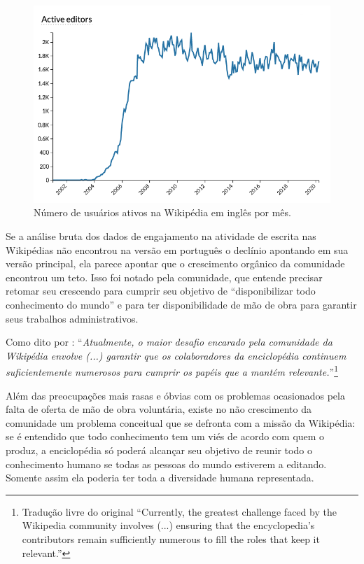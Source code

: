 \begin{figure}[hbt]
    \centering
    \includegraphics[width=1\textwidth]{Images/active_editors_ptwiki.png}
    \caption{Número de usuários ativos na Wikipédia em inglês por mês. \citep{wikimedia_stats_active_editors_ptwiki_2020} }
    \label{fig:active_editors_ptwiki}
\end{figure}

Se a análise bruta dos dados de engajamento na atividade de escrita nas Wikipédias não encontrou na versão em português o declínio apontando em sua versão principal, ela parece apontar que o crescimento orgânico da comunidade encontrou um teto. Isso foi notado pela comunidade, que entende precisar retomar seu crescendo para cumprir seu objetivo de ``disponibilizar todo conhecimento do mundo'' e para ter disponibilidade de mão de obra para garantir seus trabalhos administrativos. \citep{morgan_tea_2013}

Como dito por \cite{faulkner_etiquette_2012}: ``\textit{Atualmente, o maior desafio encarado pela comunidade da Wikipédia envolve (...) garantir que os colaboradores da enciclopédia continuem suficientemente numerosos para cumprir os papéis que a mantém relevante.}''\footnote{Tradução livre do original ``Currently, the greatest challenge faced by the Wikipedia community involves (...) ensuring that the encyclopedia’s contributors remain sufficiently numerous to fill the roles that keep it relevant.''}

Além das preocupações mais rasas e óbvias com os problemas ocasionados pela falta de oferta de mão de obra voluntária, existe no não crescimento da comunidade um problema conceitual que se defronta com a missão da Wikipédia: se é entendido que todo conhecimento tem um viés de acordo com quem o produz, a enciclopédia só poderá alcançar seu objetivo de reunir todo o conhecimento humano se todas as pessoas do mundo estiverem a editando. Somente assim ela poderia ter toda a diversidade humana representada.

